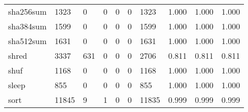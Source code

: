 \begin{longtable}{lp{1.3cm}p{1.3cm}p{1.3cm}p{1.3cm}p{1.3cm}p{1.3cm}p{1.3cm}p{1.3cm}p{1.3cm}}
sha256sum &                   1323 &                                  0 &                                 0 &                                0 &                                 0 &                            1323 &                                   1.000 &                                  1.000 &                                1.000 \\
sha384sum &                   1599 &                                  0 &                                 0 &                                0 &                                 0 &                            1599 &                                   1.000 &                                  1.000 &                                1.000 \\
sha512sum &                   1631 &                                  0 &                                 0 &                                0 &                                 0 &                            1631 &                                   1.000 &                                  1.000 &                                1.000 \\
shred     &                   3337 &                                631 &                                 0 &                                0 &                                 0 &                            2706 &                                   0.811 &                                  0.811 &                                0.811 \\
shuf      &                   1168 &                                  0 &                                 0 &                                0 &                                 0 &                            1168 &                                   1.000 &                                  1.000 &                                1.000 \\
sleep     &                    855 &                                  0 &                                 0 &                                0 &                                 0 &                             855 &                                   1.000 &                                  1.000 &                                1.000 \\
sort      &                  11845 &                                  9 &                                 1 &                                0 &                                 0 &                           11835 &                                   0.999 &                                  0.999 &                                0.999 \\

\end{longtable}
